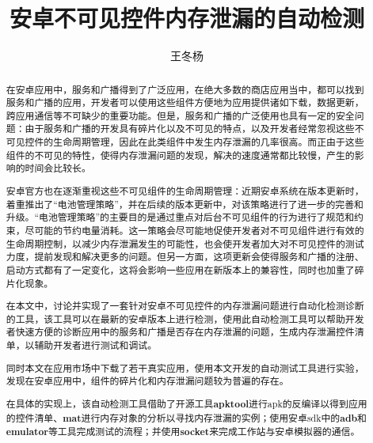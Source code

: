 \documentclass[winfonts,oneside]{njuthesis}
\title{安卓不可见控件内存泄漏的自动检测}
\author{王冬杨}
\begin{document}
\maketitle

\begin{abstract}

在安卓应用中，服务和广播得到了广泛应用，在绝大多数的商店应用当中，都可以找到服务和广播的应用，开发者可以使用这些组件方便地为应用提供诸如下载，数据更新，跨应用通信等不可缺少的重要功能。但是，服务和广播的广泛使用也具有一定的安全问题：由于服务和广播的开发具有碎片化以及不可见的特点，以及开发者经常忽视这些不可见控件的生命周期管理，因此在此类组件中发生内存泄漏的几率很高。而正由于这些组件的不可见的特性，使得内存泄漏问题的发现，解决的速度通常都比较慢，产生的影响的时间会比较长。

安卓官方也在逐渐重视这些不可见组件的生命周期管理：近期安卓系统在版本更新时，着重推出了“电池管理策略”，并在后续的版本更新中，对该策略进行了进一步的完善和升级。“电池管理策略”的主要目的是通过重点对后台不可见组件的行为进行了规范和约束，尽可能的节约电量消耗。这一策略会尽可能地促使开发者对不可见组件进行有效的生命周期控制，以减少内存泄漏发生的可能性，也会使开发者加大对不可见控件的测试力度，提前发现和解决更多的问题。但另一方面，这项更新会使得服务和广播的注册、启动方式都有了一定变化，这将会影响一些应用在新版本上的兼容性，同时也加重了碎片化现象。

在本文中，讨论并实现了一套针对安卓不可见控件的内存泄漏问题进行自动化检测诊断的工具，该工具可以在最新的安卓版本上进行检测，使用此自动检测工具可以帮助开发者快速方便的诊断应用中的服务和广播是否存在内存泄漏的问题，生成内存泄漏控件清单，以辅助开发者进行测试和调试。

同时本文在应用市场中下载了若干真实应用，使用本文开发的自动测试工具进行实验，发现在安卓应用中，组件的碎片化和内存泄漏问题较为普遍的存在。

在具体的实现上，该自动检测工具借助了开源工具\textbf{apktool}\cite{apktool}进行apk的反编译以得到应用的控件清单、\textbf{mat}\cite{mat}进行内存对象的分析以寻找内存泄漏的实例；使用安卓sdk中的\textbf{adb}和\textbf{emulator}等工具完成测试的流程；并使用\textbf{socket}来完成工作站与安卓模拟器的通信。

\end{abstract}
\end{document}
